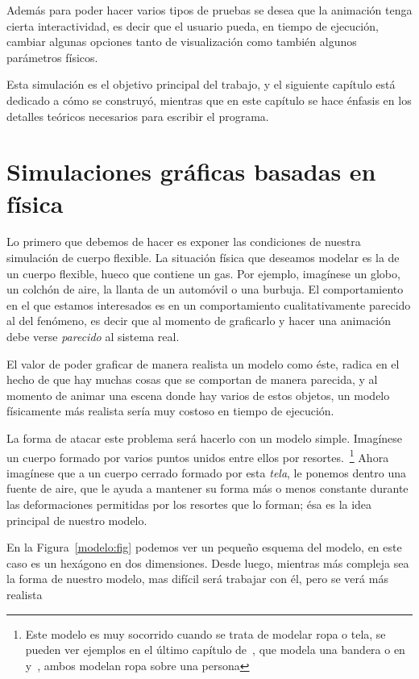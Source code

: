 Además para poder hacer varios tipos de pruebas se desea que la animación tenga cierta interactividad, es decir que el usuario pueda, en tiempo de ejecución, cambiar algunas opciones tanto de visualización como también algunos parámetros físicos.

Esta simulación es el objetivo principal del trabajo, y el siguiente capítulo está dedicado a cómo se construyó, mientras que en este capítulo se hace énfasis en los detalles teóricos necesarios para escribir el programa.

\section{Simulaciones gráficas basadas en física}

Lo primero que debemos de hacer es exponer las condiciones de nuestra simulación de cuerpo flexible. La situación física que deseamos modelar es la de un cuerpo flexible, hueco que contiene un gas.
Por ejemplo, imagínese un globo, un colchón de aire, la llanta de un automóvil o una burbuja.
El comportamiento en el que estamos interesados es en un comportamiento cualitativamente parecido al del fenómeno, es decir que al momento de graficarlo y hacer una animación debe verse \emph{parecido} al sistema real.

El valor de poder graficar de manera realista un modelo como éste, radica en el hecho de que hay muchas cosas que se comportan de manera parecida, y al momento de animar una escena donde hay varios de estos objetos, un modelo físicamente más realista sería muy costoso en tiempo de ejecución.

La forma de atacar este problema será hacerlo con un modelo simple.
Imagínese un cuerpo formado por varios puntos unidos entre ellos por resortes.~\footnote{Este modelo es muy socorrido cuando se trata de modelar ropa o tela, se pueden ver ejemplos en el último capítulo de~\cite{FisicaVideojuegos}, que modela una bandera o en~\cite{Vassilev:Ropa} y~\cite{Provot:Ropa}, ambos modelan ropa sobre una persona}
Ahora imagínese que a un cuerpo cerrado formado por esta \emph{tela}, le ponemos dentro una fuente de aire, que le ayuda a mantener su forma más o menos constante durante las deformaciones permitidas por los resortes que lo forman; ésa es la idea principal de nuestro modelo.

En la Figura~\ref{modelo:fig} podemos ver un pequeño esquema del modelo, en este caso es un hexágono en dos dimensiones.
Desde luego, mientras más compleja sea la forma de nuestro modelo, mas difícil será trabajar con él, pero se verá más realista 


